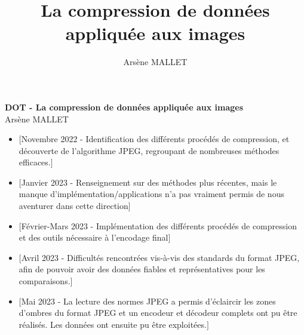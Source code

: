 \documentclass[a4paper, 11pt]{article}
\author{Arsène MALLET}
\title{La compression de donn\'ees appliqu\'ee aux images}
\let\cite=\supercite
\begin{document}
    
\begin{center}
    {\textbf {\LARGE DOT - La compression de donn\'ees appliqu\'ee aux images}} \\
    \vspace{3mm}
    {\small Arsène MALLET}
\end{center}

\vspace{5mm}

\begin{itemize}
    \item $\bigl[$Novembre 2022 - Identification des différents procédés de compression, et découverte de l'algorithme JPEG, regroupant de nombreuses méthodes efficaces.$\bigr]$
    \item $\bigl[$Janvier 2023 - Renseignement sur des méthodes plus récentes, mais le manque d'implémentation/applications n'a pas vraiment permis de nous aventurer dans cette direction$\bigr]$
    \item $\bigl[$Février-Mars 2023 - Implémentation des différents procédés de compression et des outils nécessaire à l'encodage final$\bigr]$
    \item $\bigl[$Avril 2023 - Difficultés rencontrées vis-à-vis des standards du format JPEG, afin de pouvoir avoir des données fiables et représentatives pour les comparaisons.$\bigr]$
    \item $\bigl[$Mai 2023 - La lecture des normes JPEG \cite{jpegStd} a permis d'éclaircir les zones d'ombres du format JPEG et un encodeur et décodeur complets ont pu être réalisés. Les données ont ensuite pu être exploitées.$\bigr]$
\end{itemize}

\printbibliography[title=Références bibliographiques]
\end{document}
